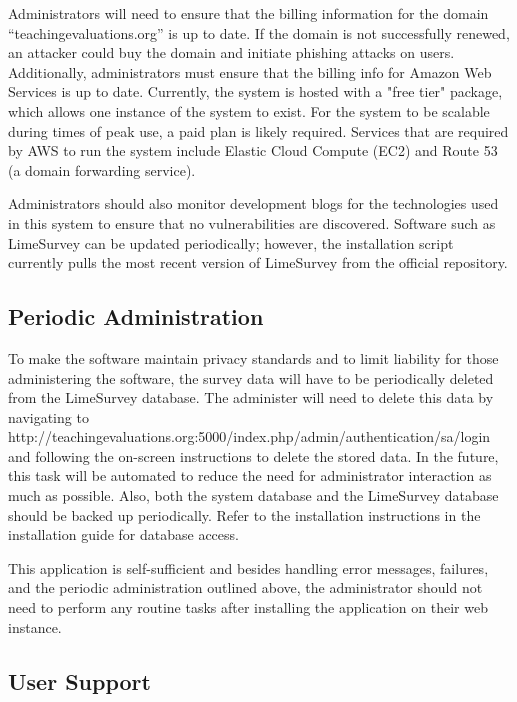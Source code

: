 \documentclass{article}
\begin{document}
Administrators will need to ensure that the billing information for the domain ``teachingevaluations.org'' is up to date. If the domain is not successfully renewed, an attacker could buy the domain and initiate phishing attacks on users. Additionally, administrators must ensure that the billing info for Amazon Web Services is up to date. Currently, the system is hosted with a "free tier" package, which allows one instance of the system to exist. For the system to be scalable during times of peak use, a paid plan is likely required. Services that are required by AWS to run the system include Elastic Cloud Compute (EC2) and Route 53 (a domain forwarding service). 

Administrators should also monitor development blogs for the technologies used in this system to ensure that no vulnerabilities are discovered. Software such as LimeSurvey can be updated periodically; however, the installation script currently pulls the most recent version of LimeSurvey from the official repository.  

\subsection{Periodic Administration}

To make the software maintain privacy standards and to limit liability for those administering the software, the survey data will have to be periodically deleted from the LimeSurvey database.  The administer will need to delete this data by navigating to http://teachingevaluations.org:5000/index.php/admin/authentication/\newline sa/login and following the on-screen instructions to delete the stored data. In the future, this task will be automated to reduce the need for administrator interaction as much as possible. Also, both the system database and the LimeSurvey database should be backed up periodically. Refer to the installation instructions in the installation guide for database access.

This application is self-sufficient and besides handling error messages, failures, and the periodic administration outlined above, the administrator should not need to perform any routine tasks after installing the application on their web instance.

\subsection{User Support}
\end{document}
